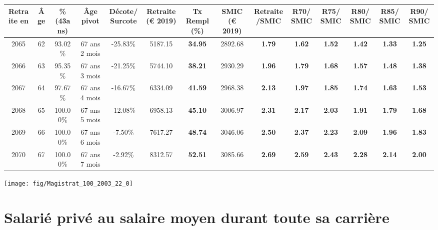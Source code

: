 \begin{adjustbox}{max width=\textwidth} 
\begin{tabular}[htb]{|c|c||c|c|c||c|c||c|c||c|c|c|c|c|} 
\hline 
 Retraite en &  Âge &  \%(43ans) &  Âge pivot &  Décote/Surcote &  Retraite (\euro{} 2019) &  Tx Rempl(\%) &  SMIC (\euro{} 2019) &  Retraite/SMIC &  R70/SMIC &  R75/SMIC &  R80/SMIC &  R85/SMIC &  R90/SMIC \\ 
\hline \hline 
 2065 &  62 &  93.02\% &  67 ans 2 mois &  -25.83\% &  5187.15 &  {\bf 34.95} &  2892.68 &  {\bf 1.79} &  {\bf 1.62} &  {\bf 1.52} &  {\bf 1.42} &  {\bf 1.33} &  {\bf 1.25} \\ 
\hline 
 2066 &  63 &  95.35\% &  67 ans 3 mois &  -21.25\% &  5744.10 &  {\bf 38.21} &  2930.29 &  {\bf 1.96} &  {\bf 1.79} &  {\bf 1.68} &  {\bf 1.57} &  {\bf 1.48} &  {\bf 1.38} \\ 
\hline 
 2067 &  64 &  97.67\% &  67 ans 4 mois &  -16.67\% &  6334.09 &  {\bf 41.59} &  2968.38 &  {\bf 2.13} &  {\bf 1.97} &  {\bf 1.85} &  {\bf 1.74} &  {\bf 1.63} &  {\bf 1.53} \\ 
\hline 
 2068 &  65 &  100.00\% &  67 ans 5 mois &  -12.08\% &  6958.13 &  {\bf 45.10} &  3006.97 &  {\bf 2.31} &  {\bf 2.17} &  {\bf 2.03} &  {\bf 1.91} &  {\bf 1.79} &  {\bf 1.68} \\ 
\hline 
 2069 &  66 &  100.00\% &  67 ans 6 mois &  -7.50\% &  7617.27 &  {\bf 48.74} &  3046.06 &  {\bf 2.50} &  {\bf 2.37} &  {\bf 2.23} &  {\bf 2.09} &  {\bf 1.96} &  {\bf 1.83} \\ 
\hline 
 2070 &  67 &  100.00\% &  67 ans 7 mois &  -2.92\% &  8312.57 &  {\bf 52.51} &  3085.66 &  {\bf 2.69} &  {\bf 2.59} &  {\bf 2.43} &  {\bf 2.28} &  {\bf 2.14} &  {\bf 2.00} \\ 
\hline 
\hline 
\end{tabular} 
\end{adjustbox} 
 
 \vspace{0.1cm} 

 {\hspace{-2.2cm}\texttt{[image: fig/Magistrat\_100\_2003\_22\_0]}} 

\newpage 
 
\chapter{Salarié privé au salaire moyen durant toute sa carrière} 

~\\ 
 
